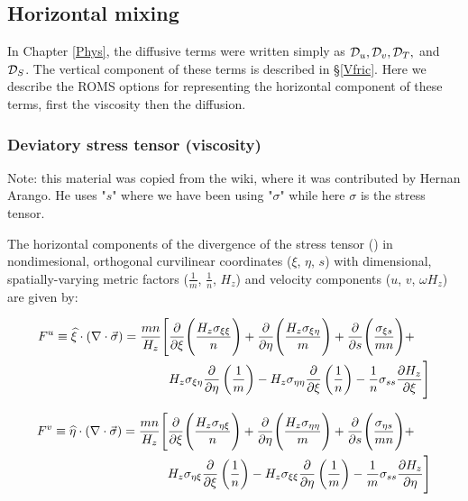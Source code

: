 \subsection{Horizontal mixing}
\label{Smooth}

In Chapter \ref{Phys}, the diffusive terms were written simply as
${\cal D}_u, {\cal D}_v, {\cal D}_T,$ and ${\cal D}_S$.  The vertical
component of these terms is described in \S\ref{Vfric}.  Here we
describe the ROMS options for representing the horizontal
component of these terms, first the viscosity then the diffusion.

\subsubsection{Deviatory stress tensor (viscosity)}

Note: this material was copied from the wiki, where it was
contributed by Hernan Arango. He uses "$s$" where we have been using
"$\sigma$" while here $\sigma$ is the stress tensor.

The horizontal components of the divergence of the stress tensor
(\cite{Wajsowicz_93}) in
nondimesional, orthogonal curvilinear coordinates ($\xi$, $\eta$,
$s$) with dimensional, spatially-varying metric factors
($\frac{1}{m}$, $\frac{1}{n}$, $H_{z}$) and velocity components
($u$, $v$, $\omega H_{z}$) are given by:

\begin{align}
      F^{u} \equiv
\widehat{\xi}\cdot\left(\nabla\cdot\vec{\sigma}\right) =
          \frac{mn}{H_{z}} \Biggl[ & {\frac{\partial }{\partial \xi}}  \Biggl(
\frac{H_{z}{\sigma}_{\xi\xi}} {n} \Biggr) +
                                     {\frac{\partial }{\partial \eta}} \Biggl(
\frac{H_{z}{\sigma}_{\xi\eta}}{m} \Biggr) +
                                     {\frac{\partial }{\partial s}}    \Biggl(
\frac{{\sigma}_{\xi s}}{mn} \Biggr) + \\
         &H_{z}{\sigma}_{\xi\eta}  {\frac{\partial }{\partial \eta}} \left(
\frac{1}{m}\right) -
          H_{z}{\sigma}_{\eta\eta} {\frac{\partial }{\partial \xi}}  \left(
\frac{1}{n}\right) -
          \frac{1}{n} {\sigma}_{ss}{\frac{\partial H_{z}}{\partial \xi}} \Biggr]
\label{eqstressu}
\end{align}

\begin{align}
      F^{v} \equiv
\widehat{\eta}\cdot\left(\nabla\cdot\vec{\sigma}\right) =
          \frac{mn}{H_{z}} \Biggl[ & {\frac{\partial }{\partial \xi}}  \Biggl(
\frac{H_{z}{\sigma}_{\eta\xi}} {n} \Biggr) +
                                     {\frac{\partial }{\partial \eta}} \Biggl(
\frac{H_{z}{\sigma}_{\eta\eta}}{m} \Biggr) +
                                     {\frac{\partial }{\partial s}}    \Biggl(
\frac{{\sigma}_{\eta s}}{mn} \Biggr) + \\
         &H_{z}{\sigma}_{\eta\xi}  {\frac{\partial }{\partial \xi}}  \left(
\frac{1}{n} \right) -
          H_{z}{\sigma}_{\xi\xi}   {\frac{\partial }{\partial \eta}} \left(
\frac{1}{m} \right) -
          \frac{1}{m}{\sigma}_{ss} {\frac{\partial H_{z}}{\partial \eta}} \Biggr]
\label{eqstressv}
\end{align}

